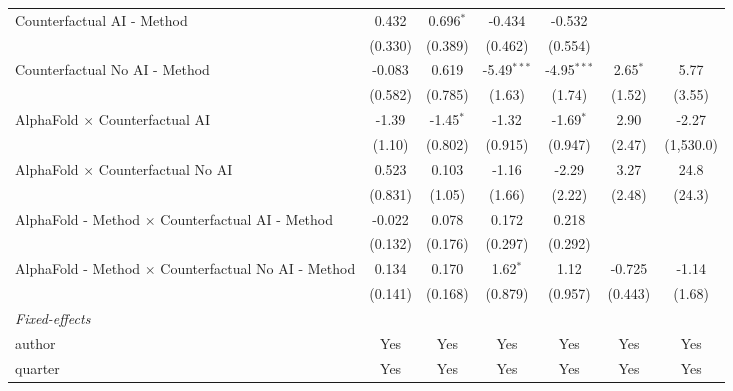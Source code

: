 \begin{tabular}{lcccccc}
   Counterfactual AI - Method                                 & 0.432   & 0.696$^{*}$ & -0.434        & -0.532        &            &   \\   
                                                              & (0.330) & (0.389)     & (0.462)       & (0.554)       &            &   \\   
   Counterfactual No AI - Method                              & -0.083  & 0.619       & -5.49$^{***}$ & -4.95$^{***}$ & 2.65$^{*}$ & 5.77\\   
                                                              & (0.582) & (0.785)     & (1.63)        & (1.74)        & (1.52)     & (3.55)\\   
   AlphaFold $\times$ Counterfactual AI                       & -1.39   & -1.45$^{*}$ & -1.32         & -1.69$^{*}$   & 2.90       & -2.27\\   
                                                              & (1.10)  & (0.802)     & (0.915)       & (0.947)       & (2.47)     & (1,530.0)\\   
   AlphaFold $\times$ Counterfactual No AI                    & 0.523   & 0.103       & -1.16         & -2.29         & 3.27       & 24.8\\   
                                                              & (0.831) & (1.05)      & (1.66)        & (2.22)        & (2.48)     & (24.3)\\   
   AlphaFold - Method $\times$ Counterfactual AI - Method     & -0.022  & 0.078       & 0.172         & 0.218         &            &   \\   
                                                              & (0.132) & (0.176)     & (0.297)       & (0.292)       &            &   \\   
   AlphaFold - Method $\times$ Counterfactual No AI - Method  & 0.134   & 0.170       & 1.62$^{*}$    & 1.12          & -0.725     & -1.14\\   
                                                              & (0.141) & (0.168)     & (0.879)       & (0.957)       & (0.443)    & (1.68)\\   
   \midrule
   \emph{Fixed-effects}\\
   author                                                     & Yes     & Yes         & Yes           & Yes           & Yes        & Yes\\  
   quarter                                                    & Yes     & Yes         & Yes           & Yes           & Yes        & Yes\\  

\end{tabular}
